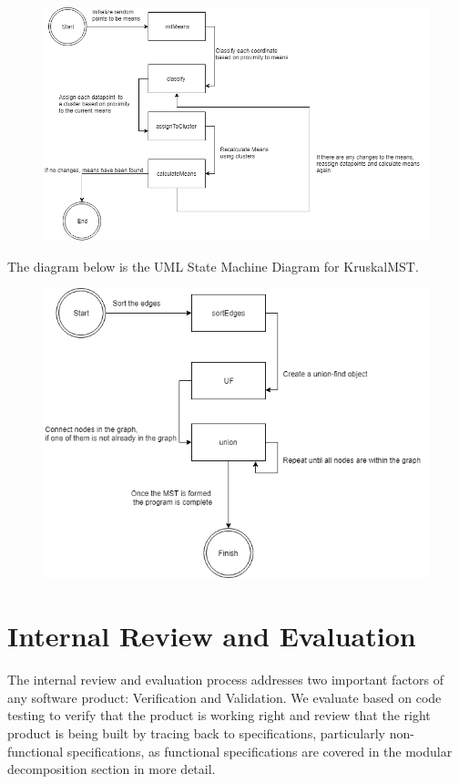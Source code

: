 \documentclass[12pt]{article}
\begin{document}
\begin{figure}[h]
\centering
\includegraphics[width=1.0\textwidth]{KMeansSM.png}
\end{figure}

\newpage

The diagram below is the UML State Machine Diagram for KruskalMST.

\begin{figure}[h]
\centering
\includegraphics[width=1.0\textwidth]{KruskalSM.png}
\end{figure}

\newpage

\section{Internal Review and Evaluation}

The internal review and evaluation process addresses two important factors of any 
software product: Verification and Validation. We evaluate based on code testing
to verify that the product is working right and review that the right product
is being built by tracing back to specifications, particularly non-functional
specifications, as functional specifications are covered in the modular
decomposition section in more detail.
\end{document}
